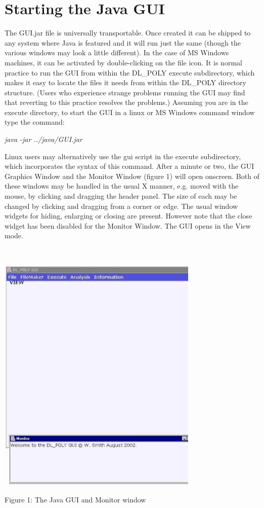 \section{Starting the Java GUI}

The GUI.jar file is universally transportable. Once created it can be shipped
to any system where Java is featured and it will run just the same (though the
various windows may look a little different). In the case of MS Windows
machines, it can be activated by double-clicking on the file icon. It is
normal practice to run the GUI from within the DL\_POLY execute subdirectory,
which makes it easy to locate the files it needs from within the DL\_POLY
directory structure. (Users who experience strange problems running the GUI
may find that reverting to this practice resolves the problems.) Assuming you
are in the execute directory, to start the GUI in a linux or MS Windows
command window type the command:

\vspace{0.25cm}
{\em java -jar ../java/GUI.jar}
\vspace{0.25cm}

\noindent
Linux users may alternatively use the gui script in the execute subdirectory,
which incorporates the syntax of this command. After a minute or two, the GUI
Graphics Window and the Monitor Window (figure 1) will open onscreen. Both of
these windows may be handled in the usual X manner, e.g. moved with the mouse,
by clicking and dragging the header panel. The size of each may be changed by
clicking and dragging from a corner or edge. The usual window widgets for
hiding, enlarging or closing are present. However note that the close widget
has been disabled for the Monitor Window. The GUI opens in the View mode.

~

\vskip 5mm
\centerline{\includegraphics[height=11.5cm]{javagui.ps}}
\centerline{Figure 1: The Java GUI and Monitor window}
\vskip 5mm

